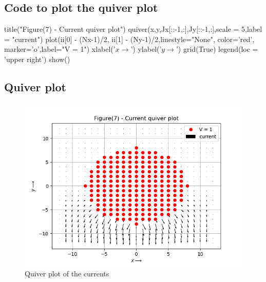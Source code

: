 \documentclass[11pt]{article}
\begin{document}
\subsection{Code to plot the quiver plot}
\begin{python}
title("Figure(7) - Current quiver plot")
quiver(x,y,Jx[::-1,:],Jy[::-1,:],scale = 5,label = "current")
plot(ii[0] - (Nx-1)/2, ii[1] - (Ny-1)/2,linestyle="None", color='red', marker='o',label="V = 1")
xlabel('$x\longrightarrow$')
ylabel('$y\longrightarrow$')
grid(True)
legend(loc = 'upper right')
show()
\end{python}

\subsection{Quiver plot}
\begin{figure}[H]
    \centering
    \includegraphics[scale = 1]{Figure_7.png}
    \caption{Quiver plot of the currents}
\end{figure}
\end{document}
